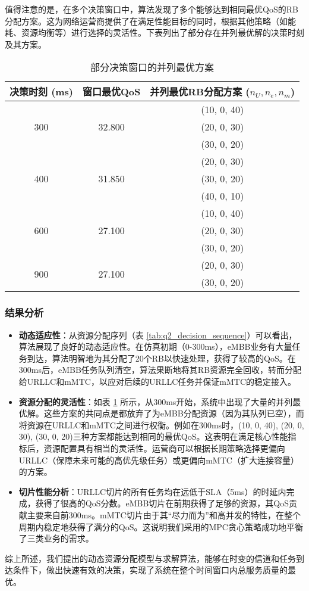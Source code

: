 值得注意的是，在多个决策窗口中，算法发现了多个能够达到相同最优QoS的RB分配方案。这为网络运营商提供了在满足性能目标的同时，根据其他策略（如能耗、资源均衡等）进行选择的灵活性。下表列出了部分存在并列最优解的决策时刻及其方案。

\begin{table}[H]
\centering
\caption{部分决策窗口的并列最优方案}
\label{tab:q2_tie_solutions}
\begin{tabular}{ccc}
\hline
\textbf{决策时刻 (ms)} & \textbf{窗口最优QoS} & \textbf{并列最优RB分配方案 ($n_U, n_e, n_m$)} \\
\hline
\multirow{3}{*}{300} & \multirow{3}{*}{32.800} & (10, 0, 40) \\
 & & (20, 0, 30) \\
 & & (30, 0, 20) \\
\hline
\multirow{3}{*}{400} & \multirow{3}{*}{31.850} & (20, 0, 30) \\
 & & (30, 0, 20) \\
 & & (40, 0, 10) \\
\hline
\multirow{3}{*}{600} & \multirow{3}{*}{27.100} & (10, 0, 40) \\
 & & (20, 0, 30) \\
 & & (30, 0, 20) \\
\hline
\multirow{2}{*}{900} & \multirow{2}{*}{27.100} & (20, 0, 30) \\
 & & (30, 0, 20) \\
\hline
\end{tabular}
\end{table}

\subsubsection{结果分析}

\begin{itemize}
    \item \textbf{动态适应性}：从资源分配序列（表 \ref{tab:q2_decision_sequence}）可以看出，算法展现了良好的动态适应性。在仿真初期（0-300ms），eMBB业务有大量任务到达，算法明智地为其分配了20个RB以快速处理，获得了较高的QoS。在300ms后，eMBB任务队列清空，算法果断地将其RB资源完全回收，转而分配给URLLC和mMTC，以应对后续的URLLC任务并保证mMTC的稳定接入。
    \item \textbf{资源分配的灵活性}：如表 \ref{tab:q2_tie_solutions} 所示，从300ms开始，系统中出现了大量的并列最优解。这些方案的共同点是都放弃了为eMBB分配资源（因为其队列已空），而将资源在URLLC和mMTC之间进行权衡。例如在300ms时，(10, 0, 40), (20, 0, 30), (30, 0, 20)三种方案都能达到相同的最优QoS。这表明在满足核心性能指标后，资源配置具有相当的灵活性。运营商可以根据长期策略选择更偏向URLLC（保障未来可能的高优先级任务）或更偏向mMTC（扩大连接容量）的方案。
    \item \textbf{切片性能分析}：URLLC切片的所有任务均在远低于SLA（5ms）的时延内完成，获得了很高的QoS分数。eMBB切片在前期获得了足够的资源，其QoS贡献主要来自前300ms。mMTC切片由于其“尽力而为”和高并发的特性，在整个周期内稳定地获得了满分的QoS。这说明我们采用的MPC贪心策略成功地平衡了三类业务的需求。
\end{itemize}

综上所述，我们提出的动态资源分配模型与求解算法，能够在时变的信道和任务到达条件下，做出快速有效的决策，实现了系统在整个时间窗口内总服务质量的最优。